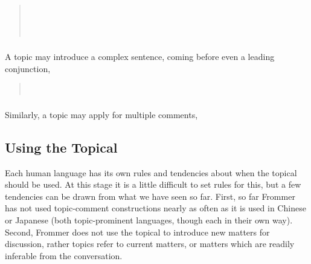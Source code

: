 \begin{quotation}
\noindent{}\\
\indent{}

\medskip
\noindent{}\\
\indent{}
\end{quotation}

\subsubsection{} A topic may introduce a complex sentence, coming
before even a leading conjunction,

\begin{quotation}
\noindent{}\\
\indent{}
\end{quotation}

\subsubsection{} Similarly, a topic may apply for multiple comments, 

\begin{quotation}
\noindent{}

\medskip
{}
\end{quotation}


\subsection{Using the Topical}
Each human language has its own rules and tendencies about when the
topical should be used.  At this stage it is a little difficult to set
rules for this, but a few tendencies can be drawn from what we have
seen so far.  First, so far Frommer has not used topic-comment
constructions nearly as often as it is used in Chinese or Japanese
(both topic-prominent languages, though each in their own way).
Second, Frommer does not use the topical to introduce new matters for
discussion, rather topics refer to current matters, or matters which
are readily inferable from the conversation.

